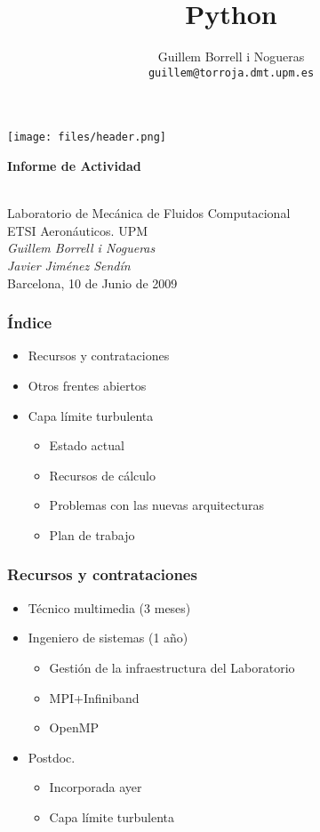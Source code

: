 \documentclass{beamer}
\title{Python}
\author{
Guillem Borrell i Nogueras\\
\texttt{guillem@torroja.dmt.upm.es}
}
\begin{document}
\begin{frame}
\begin{center}
 \texttt{[image: files/header.png]}\\
\begin{large}
\textbf{Informe de Actividad}
\end{large}\\
Laboratorio de Mecánica de Fluidos Computacional\\
ETSI Aeronáuticos. UPM\\
\vspace{0.5cm}
\textit{Guillem Borrell i Nogueras}\\
\textit{Javier Jiménez Sendín}\\
Barcelona, 10 de Junio de 2009
\end{center}

\end{frame}


\begin{frame}
\frametitle{Índice}
\begin{itemize}
\item Recursos y contrataciones
\item Otros frentes abiertos
\item Capa límite turbulenta
\begin{itemize}
\item Estado actual
\item Recursos de cálculo
\item Problemas con las nuevas arquitecturas
\item Plan de trabajo
\end{itemize}
\end{itemize}
\end{frame}

\begin{frame}
\frametitle{Recursos y contrataciones}
\begin{itemize}
\item Técnico multimedia (3 meses)
\item Ingeniero de sistemas (1 año)
\begin{itemize}
\item Gestión de la infraestructura del Laboratorio
\item MPI+Infiniband
\item OpenMP
\end{itemize}
\item Postdoc.
\begin{itemize}
\item Incorporada ayer
\item Capa límite turbulenta
\end{itemize}
\end{itemize}
\end{frame}
\end{document}

